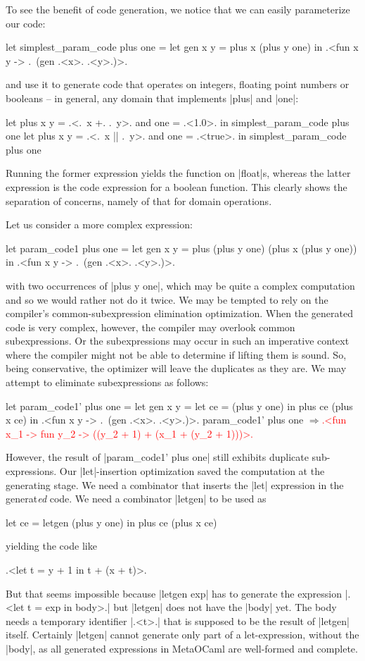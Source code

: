 \documentclass[draft]{elsart}
\newcommand{\evalresult}[1]{\ensuremath{\Longrightarrow}\textcolor{red}{#1}}
\begin{document}
To see the benefit of code generation, we notice that we can easily
parameterize our code:

\begin{code}
let simplest_param_code plus one =
  let gen x y = plus x (plus y one) in
  .<fun x y -> .~(gen .<x>. .<y>.)>.
\end{code}
and use it to generate code that operates on integers, floating point
numbers or booleans -- in general, any domain that implements |plus|
and |one|:
\begin{code}
let plus x y = .<.~x +. .~y>. and one = .<1.0>. in
  simplest_param_code plus one
let plus x y = .<.~x || .~y>. and one = .<true>. in
  simplest_param_code plus one
\end{code}
Running the former expression yields the function on |float|s, whereas
the latter expression is the code expression for a boolean function.
This clearly shows the separation of concerns, namely of that for domain
operations.

Let us consider a more complex expression:
\begin{code}
let param_code1 plus one =
  let gen x y = plus (plus y one) (plus x (plus y one)) in
  .<fun x y -> .~(gen .<x>. .<y>.)>.
\end{code}
with two occurrences of |plus y one|,
which may be quite a complex computation and so we would rather not do
it twice. We may be tempted to rely on the compiler's
common-subexpression elimination optimization. When the generated code is
very complex, however, the compiler may overlook common subexpressions.  Or the
subexpressions may occur in such an imperative context where the compiler
might not be able to determine if lifting them is sound. So, being
conservative, the optimizer will leave the duplicates as they are. 
We may attempt to eliminate subexpressions as follows: 
\begin{code}
let param_code1' plus one =
  let gen x y = let ce = (plus y one) in  plus ce (plus x ce) in
  .<fun x y -> .~(gen .<x>. .<y>.)>.
param_code1' plus one
\evalresult{.<fun x_1 -> fun y_2 -> ((y_2 + 1) + (x_1 + (y_2 + 1)))>.}
\end{code}
However,
the result of |param_code1' plus one| still exhibits duplicate
sub-expressions.  Our |let|-insertion optimization saved the
computation at the generating stage.  We need a combinator that
inserts the |let| expression in the generat\emph{ed} code. We need a
combinator |letgen| to be used as
\begin{code}
let ce = letgen (plus y one) in plus ce (plus x ce)
\end{code}
yielding the code like 
\begin{code}
.<let t = y + 1 in t + (x + t)>.
\end{code}
But that seems impossible because |letgen exp| has to generate
the expression |.<let t = exp in body>.| but |letgen| does not
have the |body| yet. The body needs a temporary identifier |.<t>.|
that is supposed to be the result of |letgen| itself.  Certainly
|letgen| cannot generate only part of a let-expression, without the
|body|, as all generated expressions in MetaOCaml are well-formed and
complete.
\end{document}
